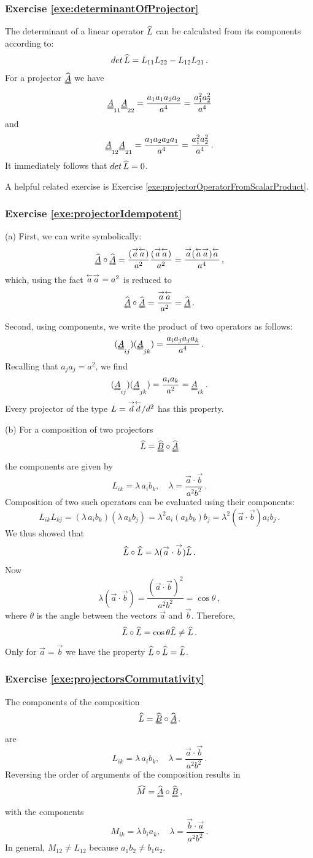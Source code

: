 \subsubsection*{Exercise \ref{exe:determinantOfProjector}}
The determinant of a linear operator $\widehat{L}$ can be calculated from
its components according to:
\[
det\,\widehat{L} = L_{11}L_{22}-L_{12}L_{21}\,.
\]
For a projector $\projop{A}$ we have
\[
\proj{A}_{11}\proj{A}_{22} = \frac{a_1a_1a_2a_2}{a^4}
= \frac{a_1^2a_2^2}{a^4}
\]
and
\[
\proj{A}_{12}\proj{A}_{21} = \frac{a_1a_2a_2a_1}{a^4}
= \frac{a_1^2a_2^2}{a^4}\,.
\]
It immediately follows that $det\,\widehat{L}=0$.

A helpful related exercise is Exercise \ref{exe:projectorOperatorFromScalarProduct}.

\subsubsection*{Exercise \ref{exe:projectorIdempotent}}
(a) First, we can write symbolically:
\[
\projop{A}\circ \projop{A} =
\frac{(\vec{a}\vecl{a})}{a^2}\frac{(\vec{a}\vecl{a})}{a^2} =
\frac{\vec{a}(\vecl{a}\vec{a})\vecl{a}}{a^4}\,,
\]
which, using the fact  $\overset{\leftarrow}{a}\overset{\rightarrow}{a}=a^2$ is reduced to
\[
\projop{A}\circ \projop{A} =
\frac{\vec{a}\vecl{a}}{a^2}=\projop{A}\,.
\]

Second, using components, we write the product of two operators as
follows:
\[
(\proj{A}_{ij})(\proj{A}_{jk}) = \frac{a_ia_ja_ja_k}{a^4}\,.
\]
Recalling that $a_ja_j = a^2$, we find
\[
(\proj{A}_{ij})(\proj{A}_{jk}) = \frac{a_ia_k}{a^2}=\proj{A}_{ik}\,.
\]
Every projector of the type $L=\overset{\rightarrow}{d}\overset{\leftarrow}{d}/d^2$ has this property.

(b) For a composition of two projectors
\[
\op{L}=\projop{B}\circ \projop{A}
\]
the components are given by
\[
L_{ik} = \lambda\, a_ib_k,\quad \lambda = \frac{\vec{a}\cdot\vec{b}}{a^2b^2}\,.
\]
Composition of two such operators can be evaluated using their components:
\[
L_{ik}L_{kj} = (\lambda\, a_ib_k)(\lambda\, a_kb_j) = \lambda^2
a_i(a_kb_k)b_j = \lambda^2 (\vec{a}\cdot\vec{b})a_ib_j\,.
\]
We thus showed that
\[
\widehat{L}\circ\widehat{L} = \lambda (\overset{\rightarrow}{a}\cdot\overset{\rightarrow}{b})\widehat{L}\,.
\]
Now
\[
\lambda (\vec{a}\cdot\vec{b}) = \frac{(\vec{a}\cdot\vec{b})^2}{a^2b^2}
= \cos\theta\,,
\]
where $\theta$ is the angle between the vectors $\vec{a}$ and
$\vec{b}$. Therefore,
\[
\widehat{L}\circ\widehat{L} = \cos\theta\widehat{L}\ne\widehat{L}\,.
\]
Only for $\vec{a}=\vec{b}$ we have the property $\widehat{L}\circ\widehat{L} = \widehat{L}$.

\subsubsection*{Exercise \ref{exe:projectorsCommutativity}}
The components of the composition
\[
\op{L}=\projop{B}\circ \projop{A}\,.
\]
are
\[
L_{ik} = \lambda\, a_ib_k,\quad \lambda = \frac{\vec{a}\cdot\vec{b}}{a^2b^2}\,.
\]
Reversing the order of arguments of the composition results in
\[
\op{M}=\projop{A}\circ \projop{B}\,,
\]
with the components
\[
M_{ik} = \lambda\, b_ia_k,\quad \lambda = \frac{\vec{b}\cdot\vec{a}}{a^2b^2}\,.
\]
In general, $M_{12} \ne L_{12}$ because $a_1b_2\ne b_1a_2$.

